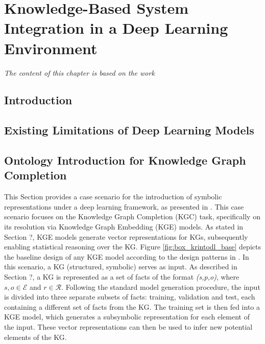 \chapter{Knowledge-Based System Integration in a Deep Learning Environment}
\label{chap:kbsintegrationdl}
\textit{The content of this chapter is based on the work \cite{amadoretalontodl}}
\section{Introduction}

\section{Existing Limitations of Deep Learning Models} \label{subsec:limitations_dl}

\section{Ontology Introduction for Knowledge Graph Completion} \label{subsec:ontointro_kgc}

This Section provides a case scenario for the introduction of symbolic representations under a deep learning framework, as presented in \cite{amadoretalontodl}. This case scenario focuses on the Knowledge Graph Completion (KGC) task, specifically on its resolution via Knowledge Graph Embedding (KGE) models. As stated in Section ?, KGE models generate vector representations for KGs, subsequently enabling statistical reasoning over the KG. Figure \ref{fig:box_krintodl_base} depicts the baseline design of any KGE model according to the design patterns in \cite{boxologyfrank}. In this scenario, a KG (structured, symbolic) serves as input. As described in Section ?, a KG is represented as a set of facts of the format \textit{(s,p,o)}, where $s,o \in \mathcal{E}$ and $r \in \mathcal{R}$. Following the standard model generation procedure, the input is divided into three separate subsets of facts: training, validation and test, each containing a different set of facts from the KG. The training set is then fed into a KGE model, which generates a subsymbolic representation for each element of the input. These vector representations can then be used to infer new potential elements of the KG. 

